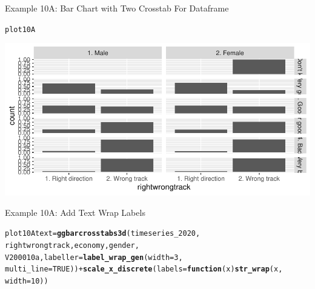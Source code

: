 \documentclass{beamer}\usepackage[]{graphicx}\usepackage[]{xcolor}
\makeatletter
\newcommand{\hlnum}[1]{\textcolor[rgb]{0.686,0.059,0.569}{#1}}%
\newcommand{\hlopt}[1]{\textcolor[rgb]{0,0,0}{#1}}%
\newcommand{\hlstd}[1]{\textcolor[rgb]{0.345,0.345,0.345}{#1}}%
\newcommand{\hlkwa}[1]{\textcolor[rgb]{0.161,0.373,0.58}{\textbf{#1}}}%
\newcommand{\hlkwb}[1]{\textcolor[rgb]{0.69,0.353,0.396}{#1}}%
\newcommand{\hlkwc}[1]{\textcolor[rgb]{0.333,0.667,0.333}{#1}}%
\newcommand{\hlkwd}[1]{\textcolor[rgb]{0.737,0.353,0.396}{\textbf{#1}}}%
\newenvironment{kframe}{%
 \def\at@end@of@kframe{}%
 \ifinner\ifhmode%
  \def\at@end@of@kframe{\end{minipage}}%
  \begin{minipage}{\columnwidth}%
 \fi\fi%
 \def\FrameCommand##1{\hskip\@totalleftmargin \hskip-\fboxsep
 \colorbox{shadecolor}{##1}\hskip-\fboxsep
     \hskip-\linewidth \hskip-\@totalleftmargin \hskip\columnwidth}%
 \MakeFramed {\advance\hsize-\width
   \@totalleftmargin\z@ \linewidth\hsize
   \@setminipage}}%
 {\par\unskip\endMakeFramed%
 \at@end@of@kframe}
\newenvironment{knitrout}{}{} %
\makeatother
\begin{document}
\begin{frame}[fragile]{Example 10A: Bar Chart with Two Crosstab For Dataframe}

\begin{knitrout}
\color{fgcolor}\begin{kframe}
\begin{alltt}
\hlstd{plot10A}
\end{alltt}
\end{kframe}
\includegraphics[width=0.95\linewidth]{figure/unnamed-chunk-58-1} 
\end{knitrout}
\end{frame}

\begin{frame}[fragile]{Example 10A: Add Text Wrap Labels}

\begin{knitrout}
\color{fgcolor}\begin{kframe}
\begin{alltt}
\hlstd{plot10Atext} \hlkwb{=} \hlkwd{ggbarcrosstabs3d}\hlstd{(timeseries_2020,}
    \hlstd{rightwrongtrack, economy, gender,}
    \hlstd{V200010a,} \hlkwc{labeller} \hlstd{=} \hlkwd{label_wrap_gen}\hlstd{(}\hlkwc{width} \hlstd{=} \hlnum{3}\hlstd{,}
        \hlkwc{multi_line} \hlstd{=} \hlnum{TRUE}\hlstd{))} \hlopt{+} \hlkwd{scale_x_discrete}\hlstd{(}\hlkwc{labels} \hlstd{=} \hlkwa{function}\hlstd{(}\hlkwc{x}\hlstd{)} \hlkwd{str_wrap}\hlstd{(x,}
    \hlkwc{width} \hlstd{=} \hlnum{10}\hlstd{))}
\end{alltt}
\end{kframe}
\end{knitrout}
\end{frame}
\end{document}
